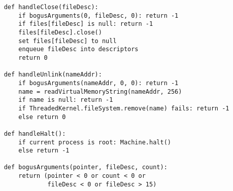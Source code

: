 \begin{verbatim}
    def handleClose(fileDesc):
        if bogusArguments(0, fileDesc, 0): return -1
        if files[fileDesc] is null: return -1
        files[fileDesc].close()
        set files[fileDesc] to null
        enqueue fileDesc into descriptors
        return 0

    def handleUnlink(nameAddr):
        if bogusArguments(nameAddr, 0, 0): return -1
        name = readVirtualMemoryString(nameAddr, 256)
        if name is null: return -1
        if ThreadedKernel.fileSystem.remove(name) fails: return -1
        else return 0

    def handleHalt():
        if current process is root: Machine.halt()
        else return -1

    def bogusArguments(pointer, fileDesc, count):
        return (pointer < 0 or count < 0 or
                fileDesc < 0 or fileDesc > 15)
\end{verbatim}
